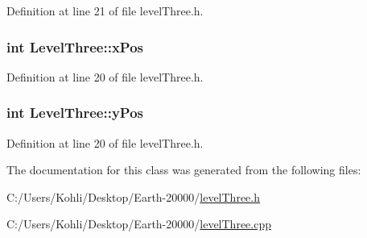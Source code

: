 Definition at line 21 of file levelThree.h.\hypertarget{class_level_three_aaa81170987ff08168cb526f05bfb6c3c}{
\subsubsection[{xPos}]{\setlength{\rightskip}{0pt plus 5cm}int {\bf LevelThree::xPos}}}
\label{class_level_three_aaa81170987ff08168cb526f05bfb6c3c}


Definition at line 20 of file levelThree.h.\hypertarget{class_level_three_ab7a05706e5bfa2fc595b1fc27a9da64d}{
\subsubsection[{yPos}]{\setlength{\rightskip}{0pt plus 5cm}int {\bf LevelThree::yPos}}}
\label{class_level_three_ab7a05706e5bfa2fc595b1fc27a9da64d}


Definition at line 20 of file levelThree.h.

The documentation for this class was generated from the following files:\begin{DoxyCompactItemize}
\item 
C:/Users/Kohli/Desktop/Earth-\/20000/\hyperlink{level_three_8h}{levelThree.h}\item 
C:/Users/Kohli/Desktop/Earth-\/20000/\hyperlink{level_three_8cpp}{levelThree.cpp}\end{DoxyCompactItemize}
